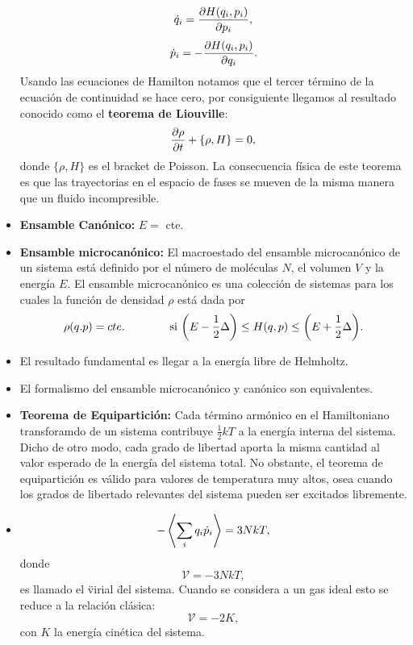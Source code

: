 \begin{itemize}
        $$ \dot{q} _i = \pdv{H(q_i ,p_i)}{p_i}, $$
        $$ \dot{p}_i = -\pdv{H(q_i ,p_i)}{q_i}. $$
    Usando las ecuaciones de Hamilton notamos que el tercer término de la ecuación de continuidad se hace cero, por consiguiente llegamos al resultado conocido como el \textbf{teorema de Liouville}:
        $$ \pdv{\rho}{t} + \{ \rho ,H \} = 0, $$
    donde $\{ \rho ,H \}$ es el bracket de Poisson. La consecuencia física de este teorema es que las trayectorias en el espacio de fases se mueven de la misma manera que un fluido incompresible.
    \item \textbf{Ensamble Canónico: } $E = $ cte.
    \item \textbf{Ensamble microcanónico: } El macroestado del ensamble microcanónico de un sistema está definido por el número de moléculas $N$, el volumen $V$ y la energía $E$. El ensamble microcanónico es una colección de sistemas para los cuales la función de densidad $\rho$ está dada por
        $$ \rho (q.p) = cte. \qquad \qquad \text{si } \qty(E - \frac{1}{2} \Delta) \leq H(q,p) \leq \qty(E + \frac{1}{2} \Delta). $$
    \item El resultado fundamental es llegar a la energía libre de Helmholtz.
    \item El formalismo del ensamble microcanónico y canónico son equivalentes.
    \item \textbf{Teorema de Equipartición: } Cada término armónico en el Hamiltoniano transforamdo de un sistema contribuye $\frac{1}{2} kT$ a la energía interna del sistema. Dicho de otro modo, cada grado de libertad aporta la misma cantidad al valor esperado de la energía del sistema total. No obstante, el teorema de equipartición es válido para valores de temperatura muy altos, osea cuando los grados de libertado relevantes del sistema pueden ser excitados libremente.
    \item 
        $$ - \expval{\sum _i q_i \dot{p}_i} = 3NkT, $$
    donde
        $$ \mathcal{V} = -3NkT, $$
    es llamado el \" virial \" del sistema. Cuando se considera a un gas ideal esto se reduce a la relación clásica:
        $$ \mathcal{V} = -2K, $$
    con $K$ la energía cinética del sistema.
\end{itemize}


